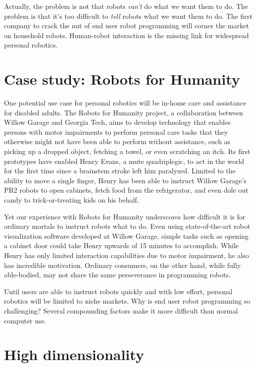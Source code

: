 \documentclass{article}
\begin{document}
Actually, the problem is not that robots {\em can't} do what we want them to do. The problem is that it's too difficult to {\em tell} robots what we want them to do. The first company to crack the nut of end user robot programming will corner the market on household robots. Human-robot interaction is the missing link for widespread personal robotics.

\section{Case study: Robots for Humanity}

One potential use case for personal robotics will be in-home care and assistance for disabled adults. The Robots for Humanity project, a collaboration between Willow Garage and Georgia Tech, aims to develop technology that enables persons with motor impairments to perform personal care tasks that they otherwise might not have been able to perform without assistance, such as picking up a dropped object, fetching a towel, or even scratching an itch. Its first prototypes have enabled Henry Evans, a mute quadriplegic, to act in the world for the first time since a brainstem stroke left him paralyzed. Limited to the ability to move a single finger, Henry has been able to instruct Willow Garage's PR2 robots to open cabinets, fetch food from the refrigerator, and even dole out candy to trick-or-treating kids on his behalf.

Yet our experience with Robots for Humanity underscores how difficult it is for ordinary mortals to instruct robots what to do. Even using state-of-the-art robot visualization software developed at Willow Garage, simple tasks such as opening a cabinet door could take Henry upwards of 15 minutes to accomplish.  While Henry has only limited interaction capabilities due to motor impairment, he also has incredible motivation. Ordinary consumers, on the other hand, while fully able-bodied, may not share the same perseverance in programming robots.

Until users are able to instruct robots quickly and with low effort, personal robotics will be limited to niche markets.  Why is end user robot programming so challenging? Several compounding factors make it more difficult than normal computer use.

\section{High dimensionality}
\end{document}

